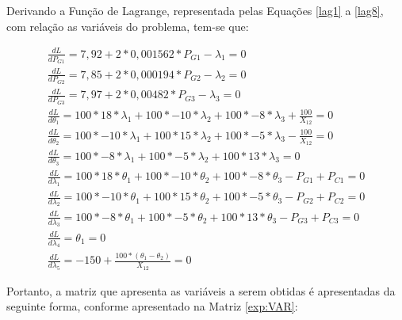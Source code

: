 		Derivando a Função de Lagrange, representada pelas Equações \ref{lag1} a \ref{lag8}, com relação as variáveis do problema, tem-se que: 
 	
		\begin{align}
			\frac{dL}{dP_{G1}} = 7,92 + 2*0,001562*P_{G1} - \lambda{_1} = 0
			\label{derlag1}\\
			\frac{dL}{dP_{G2}} = 7,85 + 2*0,000194*P_{G2} - \lambda{_2} = 0
			\label{derlag2}\\
			\frac{dL}{dP_{G3}} = 7,97 + 2*0,00482*P_{G3} - \lambda{_3} = 0
			\label{derlag3}\\
			\frac{dL}{d\theta{_1}} = 100*18*\lambda{_1} + 100*-10*\lambda{_2} + 100*-8*\lambda{_3} + \frac{100}{X_{12}}= 0
			\label{derlag4}\\
			\frac{dL}{d\theta{_2}} = 100*-10*\lambda{_1} + 100*15*\lambda{_2} + 100*-5*\lambda{_3} - \frac{100}{X_{12}} = 0
			\label{derlag5}\\
			\frac{dL}{d\theta{_3}} = 100*-8*\lambda{_1} + 100*-5*\lambda{_2} + 100*13*\lambda{_3} = 0
			\label{derlag6}\\
			\frac{dL}{d\lambda{_1}} = 100*18*\theta{_1} + 100*-10*\theta{_2} + 100*-8*\theta{_3} - P_{G1} + P_{C1} = 0
			\label{derlag7}\\
			\frac{dL}{d\lambda{_2}} = 100*-10*\theta{_1} + 100*15*\theta{_2} + 100*-5*\theta{_3} - P_{G2} + P_{C2} = 0
			\label{derlag8}\\
			\frac{dL}{d\lambda{_3}} = 100*-8*\theta{_1} + 100*-5*\theta{_2} + 100*13*\theta{_3} - P_{G3} + P_{C3} = 0
			\label{derlag9}\\
			\frac{dL}{d\lambda{_4}} = \theta{_1} = 0
			\label{derlag10}\\
			\frac{dL}{d\lambda{_5}} = -150 + \frac{100*(\theta{_1} - \theta{_2})}{X_{12}} = 0
			\label{derlag11}
		\end{align}
		
		Portanto, a matriz que apresenta as variáveis a serem obtidas é apresentadas da seguinte forma, conforme apresentado na Matriz \ref{exp:VAR}:
		
